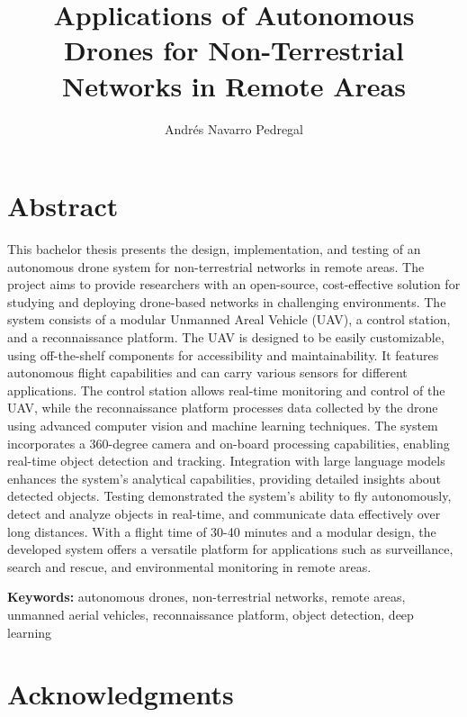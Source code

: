 \documentclass[oneside, 12pt, a4paper]{book}
\title{Applications of Autonomous Drones for Non-Terrestrial Networks in Remote Areas}
\author{Andrés Navarro Pedregal}
\begin{document}

\frontmatter
\maketitle

\blankpage%
\chapter*{Abstract}

This bachelor thesis presents the design, implementation, and testing of an autonomous drone system for non-terrestrial networks in remote areas. The project aims to provide researchers with an open-source, cost-effective solution for studying and deploying drone-based networks in challenging environments. The system consists of a modular Unmanned Areal Vehicle (UAV), a control station, and a reconnaissance platform. The UAV is designed to be easily customizable, using off-the-shelf components for accessibility and maintainability. It features autonomous flight capabilities and can carry various sensors for different applications. The control station allows real-time monitoring and control of the UAV, while the reconnaissance platform processes data collected by the drone using advanced computer vision and machine learning techniques. The system incorporates a 360-degree camera and on-board processing capabilities, enabling real-time object detection and tracking. Integration with large language models enhances the system's analytical capabilities, providing detailed insights about detected objects. Testing demonstrated the system's ability to fly autonomously, detect and analyze objects in real-time, and communicate data effectively over long distances. With a flight time of 30-40 minutes and a modular design, the developed system offers a versatile platform for applications such as surveillance, search and rescue, and environmental monitoring in remote areas.

\textbf{Keywords:} autonomous drones, non-terrestrial networks, remote areas, unmanned aerial vehicles, reconnaissance platform, object detection, deep learning

\blankpage%

\chapter*{Acknowledgments}
\begingroup
\let\clearpage\relax %
\end{document}
